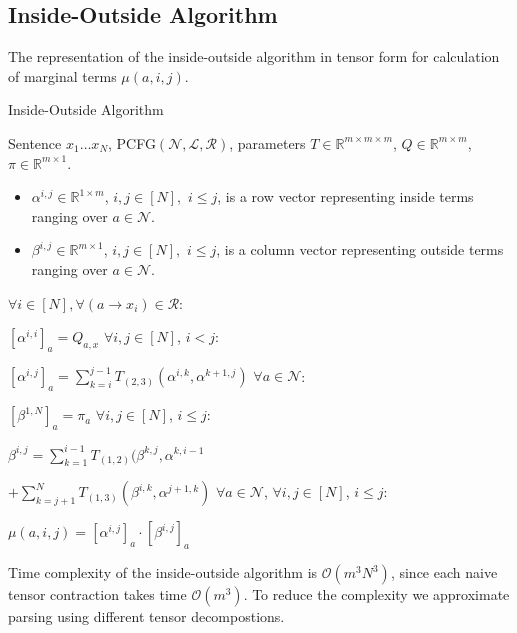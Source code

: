 \documentclass[conference]{IEEEtran}
\newcommand{\R}{\mathbb{R}}
\begin{document}
\subsection{Inside-Outside Algorithm}
The representation of the inside-outside algorithm
in tensor form for calculation of marginal terms $\mu(a,i,j)$.
\begin{algorithm}[h!]
\caption{Inside-Outside Algorithm}
\label{alg:inside-outside}
\begin{algorithmic}
     Sentence $x_1 \dots x_N$,
    PCFG$(\mathcal{N},\mathcal{L, R})$, parameters $T \in \R^{m\times m\times m}$, $Q \in \R^{m\times m}$, $\pi \in \R^{m\times1}$.
    
    \begin{itemize}
        \item $\alpha^{i,j} \in \R^{1\times m}$,
    $i,j \in [N],$ $i \leq j$, is a row vector representing inside terms ranging over $a \in \mathcal{N}$.
        \item $\beta^{i,j} \in \R^{m\times 1}$,
    $i,j \in [N],$ $i \leq j$, is a column vector representing outside terms ranging over $a \in \mathcal{N}$.
    \end{itemize}
    
     $\forall i \in [N], \forall(a \to x_i) \in \mathcal{R}$:
    
    $[\alpha^{i,i}]_a = Q_{a,x}$
     $\forall i,j \in [N]$, $i < j$:
    
    $[\alpha^{i,j}]_a = \sum_{k=i}^{j-1} T_{(2,3)}(\alpha^{i,k},\alpha^{k+1,j})$
     $\forall a \in \mathcal{N}$:
    
    $[\beta^{1,N}]_a = \pi_a$
     $\forall i,j \in [N]$, $i \leq j$:
    
    $\beta^{i,j} = \sum_{k=1}^{i-1} T_{(1,2)}(\beta^{k,j},\alpha^{k,i-1}$  
    
    $+ \sum_{k=j+1}^{N} T_{(1,3)}(\beta^{i,k},\alpha^{j+1,k})$
     $\forall a \in \mathcal{N}$, $ \forall i,j \in [N]$, $i \leq j$:
    
    $ \mu(a,i,j) = [\alpha^{i,j}]_a \cdot [\beta^{i,j}]_a$
\end{algorithmic}
\end{algorithm}

Time complexity of the inside-outside algorithm is $\mathcal{O}(m^3N^3)$,
since each naive tensor contraction takes time $\mathcal{O}(m^3)$.
To reduce the complexity we approximate parsing using different tensor decompostions.
\end{document}
